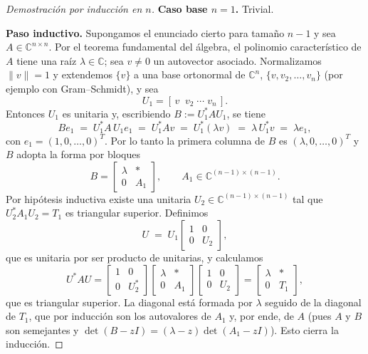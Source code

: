\begin{proof}[Demostración por inducción en $n$]
\textbf{Caso base $n=1$.} Trivial.

\smallskip
\textbf{Paso inductivo.} Supongamos el enunciado cierto para tamaño $n-1$ y sea
$A\in\mathbb{C}^{n\times n}$. Por el teorema fundamental del álgebra, el polinomio
característico de $A$ tiene una raíz $\lambda\in\mathbb{C}$; sea $v\neq 0$ un autovector
asociado. Normalizamos $\|v\|=1$ y extendemos $\{v\}$ a una base ortonormal de
$\mathbb{C}^n$, $\{v,v_2,\dots,v_n\}$ (por ejemplo con Gram--Schmidt), y sea
\[
U_1=[\,v\;\;v_2\;\cdots\;v_n\,].
\]
Entonces $U_1$ es unitaria y, escribiendo $B:=U_1^{*}AU_1$, se tiene
\[
B e_1 \;=\; U_1^{*}A\,U_1e_1\;=\;U_1^{*}A v \;=\; U_1^{*}(\lambda v)\;=\;\lambda\, U_1^{*}v\;=\;\lambda e_1 ,
\]
con $e_1=(1,0,\dots,0)^{T}$. Por lo tanto la primera columna de $B$ es
$(\lambda,0,\dots,0)^{T}$ y $B$ adopta la forma por bloques
\[
B=\begin{bmatrix}
\lambda & *\\[2pt]
0 & A_1
\end{bmatrix},
\qquad A_1\in\mathbb{C}^{(n-1)\times(n-1)}.
\]
Por hipótesis inductiva existe una unitaria $U_2\in\mathbb{C}^{(n-1)\times(n-1)}$
tal que $U_2^{*}A_1U_2=T_1$ es triangular superior. Definimos
\[
U \;=\; U_1\begin{bmatrix}1&0\\[2pt]0&U_2\end{bmatrix},
\]
que es unitaria por ser producto de unitarias, y calculamos
\[
U^{*}AU
=\begin{bmatrix}1&0\\[2pt]0&U_2^{*}\end{bmatrix}
\begin{bmatrix}\lambda & *\\[2pt]0 & A_1\end{bmatrix}
\begin{bmatrix}1&0\\[2pt]0&U_2\end{bmatrix}
=
\begin{bmatrix}\lambda & *\\[2pt]0 & T_1\end{bmatrix},
\]
que es triangular superior. La diagonal está formada por $\lambda$ seguido de la
diagonal de $T_1$, que por inducción son los autovalores de $A_1$ y, por ende, de $A$
(pues $A$ y $B$ son semejantes y $\det(B-zI)=(\lambda-z)\det(A_1-zI)$).
Esto cierra la inducción.
\end{proof}

